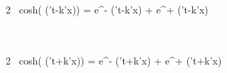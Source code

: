 

\\
2 \ cosh(\frac {\beta}{\left | \beta \right |} \sqrt {} (\omega't-k'x)) = e^{-\frac {\beta}{\left | \beta \right |} \sqrt {} (\omega't-k'x)} + e^{+\frac {\beta}{\left | \beta \right |} \sqrt {} (\omega't-k'x)}

\\\\

2 \ cosh(\frac {\beta}{\left | \beta \right |} \sqrt {} (\omega't+k'x)) = e^{-\frac {\beta}{\left | \beta \right |} \sqrt {} (\omega't+k'x)} + e^{+\frac {\beta}{\left | \beta \right |} \sqrt {} (\omega't+k'x)}
